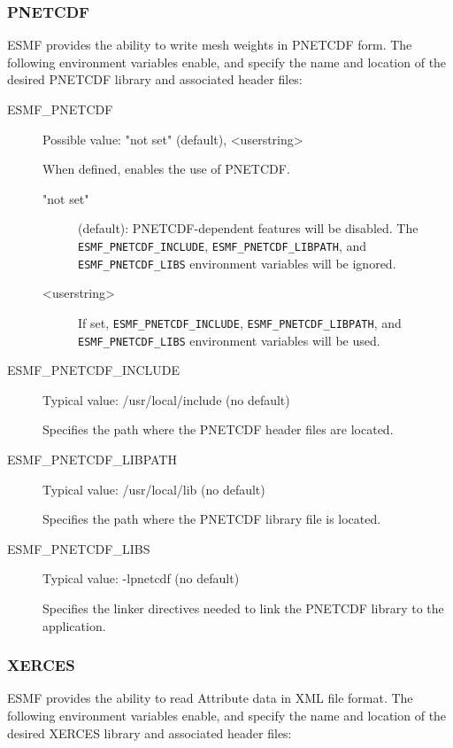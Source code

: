 \subsubsection{PNETCDF}
\label{sec:pnetcdf}
ESMF provides the ability to write mesh weights in PNETCDF form.  The
following environment variables enable, and specify the name and location
of the desired PNETCDF library and associated header files:

\begin{description}
\item[ESMF\_PNETCDF] Possible value: "not set" (default), <userstring>

When defined, enables the use of PNETCDF.

\begin{description}
\item["not set"] (default): PNETCDF-dependent features will be disabled.
The {\tt ESMF\_PNETCDF\_INCLUDE}, {\tt ESMF\_PNETCDF\_LIBPATH}, and
{\tt ESMF\_PNETCDF\_LIBS} environment variables will be ignored.

\item[<userstring>] If set, {\tt ESMF\_PNETCDF\_INCLUDE},
{\tt ESMF\_PNETCDF\_LIBPATH}, and {\tt ESMF\_PNETCDF\_LIBS} environment
variables will be used.
\end{description}

\item[ESMF\_PNETCDF\_INCLUDE] Typical value: /usr/local/include (no default)

Specifies the path where the PNETCDF header files are located.

\item[ESMF\_PNETCDF\_LIBPATH] Typical value: /usr/local/lib (no default)

Specifies the path where the PNETCDF library file is located.

\item[ESMF\_PNETCDF\_LIBS] Typical value: -lpnetcdf (no default)

Specifies the linker directives needed to link the PNETCDF library to the
application.
\end{description}

\subsubsection{XERCES}
\label{sec:xerces}
ESMF provides the ability to read Attribute data in XML file format.  The
following environment variables enable, and specify the name and location
of the desired XERCES library and associated header files:

